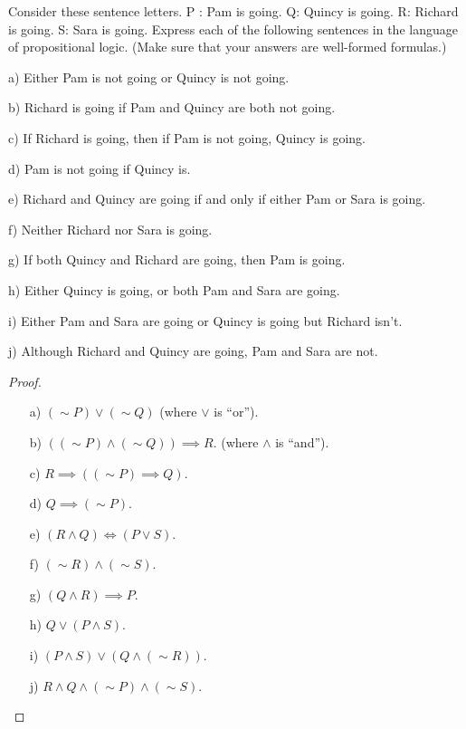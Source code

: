 \documentclass{article}
\begin{document}
\newpage

\begin{ques}\label{q10}
Consider these sentence letters. P : Pam is going. Q: Quincy
is going. R: Richard is going. S: Sara is going. Express each of the following
sentences in the language of propositional logic. (Make sure that your answers
are well-formed formulas.)

a) Either Pam is not going or Quincy is not going.

b) Richard is going if Pam and Quincy are both not going.

c) If Richard is going, then if Pam is not going, Quincy is going.

d) Pam is not going if Quincy is.

e) Richard and Quincy are going if and only if either Pam or Sara is going.

f) Neither Richard nor Sara is going.

g) If both Quincy and Richard are going, then Pam is going.

h) Either Quincy is going, or both Pam and Sara are going.

i) Either Pam and Sara are going or Quincy is going but Richard isn’t.

j) Although Richard and Quincy are going, Pam and Sara are not.
\end{ques}

\begin{proof}

    \hfil

    \begin{itemize}
        \item[a)] $(\sim P) \vee (\sim Q)$ (where $\vee$ is ``or'').
        \item[b)] $((\sim P) \wedge (\sim Q))\implies R$. (where $\wedge$ is ``and'').
        \item[c)] $R \implies ((\sim P) \implies Q)$.
        \item[d)] $Q \implies (\sim P)$.
        \item[e)] $(R \wedge Q)\iff (P \vee S)$.
        \item[f)] $(\sim R) \wedge (\sim S)$.
        \item[g)] $(Q \wedge R)\implies P$.
        \item[h)] $Q \vee (P \wedge S)$.
        \item[i)] $(P \wedge S) \vee (Q \wedge (\sim R))$.
        \item[j)] $R \wedge Q \wedge (\sim P) \wedge (\sim S)$.
    \end{itemize}
\end{proof}
\end{document}
